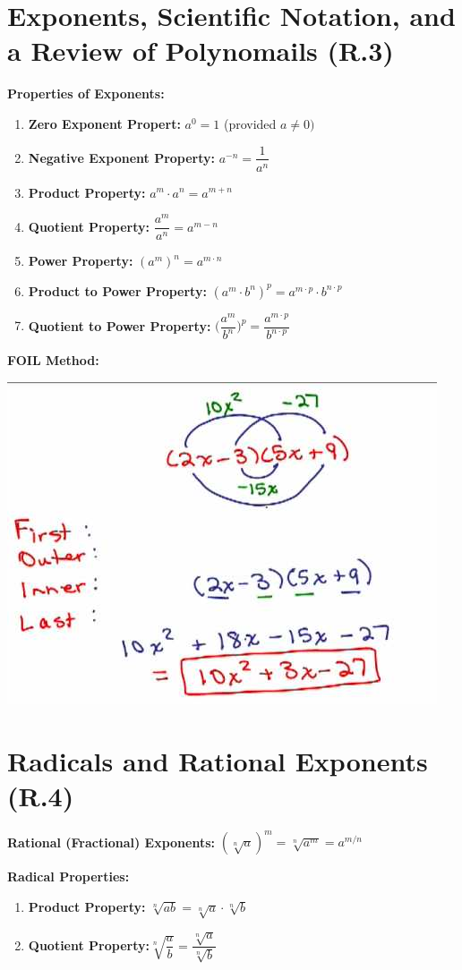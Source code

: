 \documentclass[12pt]{article}
\begin{document}
\section{Exponents, Scientific Notation, and a Review of Polynomails (R.3)}

\textbf{Properties of Exponents:}

\begin{enumerate}

\item \textbf{Zero Exponent Propert:} $a^0 = 1$ (provided $a \neq 0)$
\item \textbf{Negative Exponent Property:} $a^{-n} = \dfrac{1}{a^{n}}$
\item \textbf{Product Property:} $a^{m} \cdot a^{n} = a^{m+n}$
\item \textbf{Quotient Property:} $\dfrac{a^{m}}{a^{n}} = a^{m-n}$
\item \textbf{Power Property:} $(a^{m})^{n} = a^{m \cdot n}$
\item \textbf{Product to Power Property:} $(a^{m} \cdot b^{n})^{p} = a^{m \cdot p} \cdot b^{n \cdot p} $
\item \textbf{Quotient to Power Property:} $\Big(\dfrac{a^{m}}{b^{n}}\Big)^{p} = \dfrac{a^{m \cdot p}}{b^{n \cdot p}}$

\end{enumerate}

\textbf{FOIL Method:}

\centerline{\includegraphics[scale = 0.5]{foil.jpg}}

\section{Radicals and Rational Exponents (R.4)}

\textbf{Rational (Fractional) Exponents:} $(\sqrt[n]{a})^{m} = \sqrt[n]{a^{m}} = a^{m/n}$

\textbf{Radical Properties:}

\begin{enumerate}

\item \textbf{Product Property:} $\sqrt[n]{ab} = \sqrt[n]{a} \cdot \sqrt[n]{b}$
\item \textbf{Quotient Property:}$\sqrt[n]{\dfrac{a}{b}} = \dfrac{\sqrt[n]{a}}{\sqrt[n]{b}}$

\end{enumerate}
\end{document}
